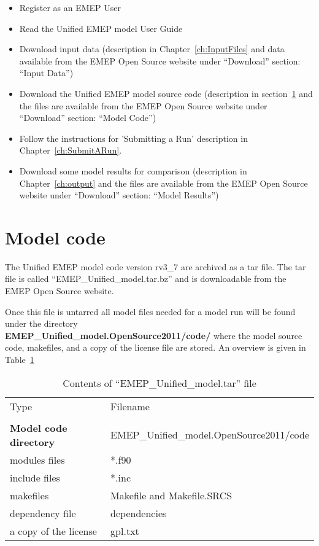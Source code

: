 \begin{itemize}
\item Register as an EMEP User
\item Read the Unified EMEP model User Guide
\item
Download input data (description in Chapter~\ref{ch:InputFiles} and
data available from the EMEP Open Source website under ``Download''
section: ``Input Data'')
\item
Download the Unified EMEP model source code (description in 
section~\ref{sec:ModelCode} and the files are available from the EMEP 
Open Source website under ``Download'' section: ``Model Code'')
\item
Follow the instructions for 'Submitting a Run' description in
Chapter~\ref{ch:SubmitARun}.
\item
Download some model results for comparison (description in
Chapter~\ref{ch:output} and the files are available from the EMEP 
Open Source website under ``Download'' section: ``Model Results'')
\end{itemize}

\section{Model code}
\label{sec:ModelCode}

The Unified EMEP model code version rv3\_7 are archived as a tar file. 
The tar file is called ``EMEP\_Unified\_model.tar.bz'' and is downloadable from
the EMEP Open Source website.

Once this file is untarred all model files needed for a model run will be found under the
directory \\ {\bf EMEP\_Unified\_model.OpenSource2011/code/} where the model source code, 
makefiles, and a copy of the license file are stored. An overview is given in 
Table~\ref{Tab:modelfiles}

\begin{table}[h]
\begin{center}
\caption{Contents of ``EMEP\_Unified\_model.tar'' file
   \label{Tab:modelfiles}}
\begin{tabular}{ll}
& \\
\hline
Type      & Filename          \\
\hline
& \\
{\bf Model code directory} & EMEP\_Unified\_model.OpenSource2011/code \\ 
\hline
modules files & *.f90 \\
include files & *.inc \\
makefiles & Makefile and Makefile.SRCS \\
dependency file &  dependencies\\
a copy of the license & gpl.txt \\
\hline
\end{tabular}
\end{center}
\end{table}





